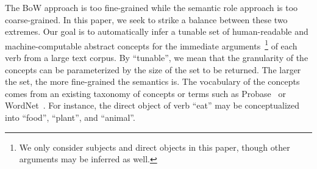 The BoW approach is too fine-grained while the semantic role approach
is too coarse-grained.
In this paper, we seek to strike a balance between these two
extremes. Our goal is to automatically infer a tunable set of
human-readable and machine-computable abstract concepts for
the immediate arguments~\footnote{We only consider subjects and
direct objects in this paper, though other arguments may be inferred
as well.} of each verb from a large text corpus.
By ``tunable'', we mean that the granularity of
the concepts can be parameterized by the size of the set to be returned.
The larger the set, the more fine-grained the semantics is.
The vocabulary of the concepts
comes from an existing taxonomy of concepts or terms such as
Probase~\cite{WuLWZ12}  or WordNet~\cite{wordnet}.
For instance, the direct object of verb ``eat'' may be conceptualized
into ``food'', ``plant'', and ``animal''.



